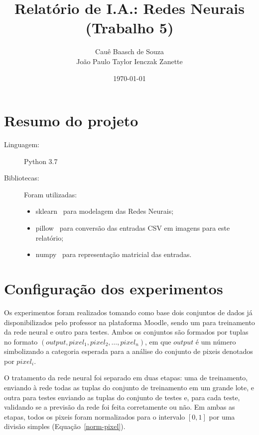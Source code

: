\documentclass[twocolumn]{article}
\title{Relatório de I.A.: Redes Neurais (Trabalho 5)}
\author{Cauê Baasch de Souza \\
        João Paulo Taylor Ienczak Zanette}
\date{\today}
\begin{document}
    \maketitle{}

    \section{Resumo do projeto}

    \begin{description}
        \item [Linguagem:] Python 3.7
        \item [Bibliotecas:] Foram utilizadas:


            \begin{itemize}
                \item sklearn~\cite{sklearn} para modelagem das Redes Neurais;
                \item pillow~\cite{pillow} para conversão das entradas CSV em
                    imagens para este relatório;
                \item numpy~\cite{numpy} para representação matricial das
                    entradas.
            \end{itemize}
    \end{description}

    \section{Configuração dos experimentos}

    Os experimentos foram realizados tomando como base dois conjuntos de dados
    já disponibilizados pelo professor na plataforma Moodle, sendo um para
    treinamento da rede neural e outro para testes. Ambos os conjuntos são
    formados por tuplas no formato $(output, pixel_1, pixel_2, \ldots,
    pixel_n)$, em que $output$ é um número simbolizando a categoria esperada
    para a análise do conjunto de pixeis denotados por $pixel_{i}$.

    O tratamento da rede neural foi separado em duas etapas: uma de
    treinamento, enviando à rede todas as tuplas do conjunto de treinamento em
    um grande lote, e outra para testes enviando as tuplas do conjunto de
    testes e, para cada teste, validando se a previsão da rede foi feita
    corretamente ou não. Em ambas as etapas, todos os pixeis foram normalizados
    para o intervalo $[0, 1]$ por uma divisão simples
    (Equação~\ref{norm-pixel}).
\end{document}
